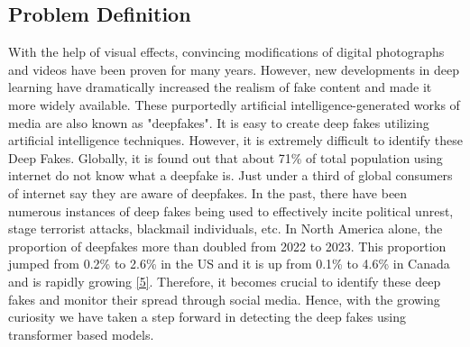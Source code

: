 \subsection{Problem Definition}
With the help of visual effects, convincing modifications of digital photographs and videos have been proven for many years. However, new developments in deep learning have dramatically increased the realism of fake content and made it more widely available. These purportedly artificial intelligence-generated works of media are also known as "deepfakes". It is easy to create deep fakes utilizing artificial intelligence techniques. However, it is extremely difficult to identify these Deep Fakes.
Globally, it is found out that about 71\% of total population using internet do not know what a deepfake is. Just under a third of global consumers of internet say they are aware of deepfakes. In the past, there have been numerous instances of deep fakes being used to effectively incite political unrest, stage terrorist attacks, blackmail individuals, etc.
In North America alone, the proportion of deepfakes more than doubled from 2022 to 2023. This proportion jumped from 0.2\% to 2.6\% in the US and it is up from 0.1\% to 4.6\% in Canada and is rapidly growing \hyperref[ref5]{[5]}. Therefore, it becomes crucial to identify these deep fakes and monitor their spread through social media. Hence, with the growing curiosity we have taken a step forward in detecting the deep fakes using transformer based models.